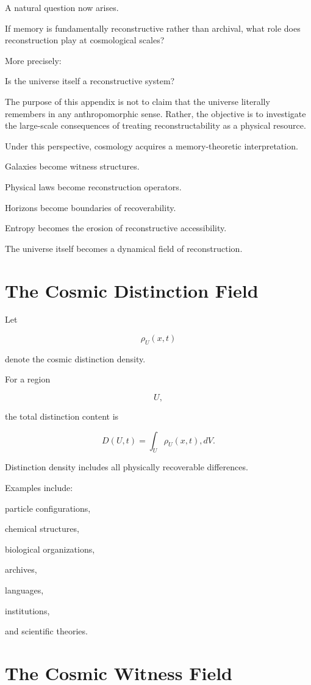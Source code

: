 \documentclass[12pt,oneside]{book}
\theoremstyle{plain} \newtheorem{theorem}{Theorem}[chapter] \newtheorem{lemma}[theorem]{Lemma} \newtheorem{proposition}[theorem]{Proposition} \newtheorem{corollary}[theorem]{Corollary}
\theoremstyle{definition} \newtheorem{definition}[theorem]{Definition} \newtheorem{axiom}[theorem]{Axiom} \newtheorem{construction}[theorem]{Construction}
\theoremstyle{remark} \newtheorem{remark}[theorem]{Remark} \newtheorem{example}[theorem]{Example}
\begin{document}
A natural question now arises.

If memory is fundamentally reconstructive rather than archival, what role does reconstruction play at cosmological scales?

More precisely:

Is the universe itself a reconstructive system?

The purpose of this appendix is not to claim that the universe literally remembers in any anthropomorphic sense. Rather, the objective is to investigate the large-scale consequences of treating reconstructability as a physical resource.

Under this perspective, cosmology acquires a memory-theoretic interpretation.

Galaxies become witness structures.

Physical laws become reconstruction operators.

Horizons become boundaries of recoverability.

Entropy becomes the erosion of reconstructive accessibility.

The universe itself becomes a dynamical field of reconstruction.

\section{The Cosmic Distinction Field}

Let

\[
\rho_U(x,t)
\]

denote the cosmic distinction density.

For a region

\[
U,
\]

the total distinction content is

\[
D(U,t)
=
\int_U
\rho_U(x,t),dV.
\]

Distinction density includes all physically recoverable differences.

Examples include:

particle configurations,

chemical structures,

biological organizations,

archives,

languages,

institutions,

and scientific theories.

\section{The Cosmic Witness Field}
\end{document}

